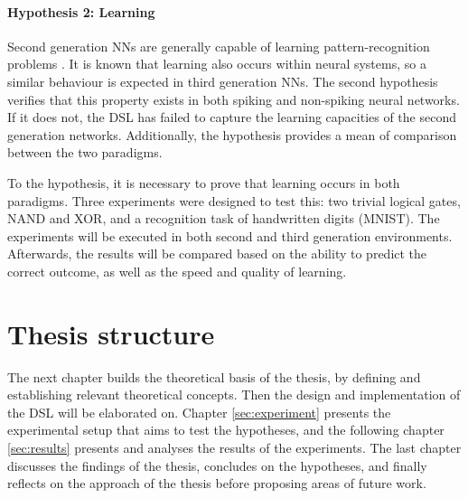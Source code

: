 \paragraph{Hypothesis 2: Learning}
Second generation \gls{NN}s are generally capable of learning pattern-recognition
problems \cite{Russel2007}.
It is known that learning also occurs within neural systems, so a
similar behaviour is expected in third generation \gls{NN}s.
The second hypothesis verifies that this property exists in both spiking and
non-spiking neural networks.
If it does not, the \gls{DSL} has failed to capture
the learning capacities of the second generation networks.
Additionally, the hypothesis provides a mean of comparison between the two paradigms.

To the hypothesis, it is necessary to prove that learning occurs
in both paradigms.
Three experiments were designed to test this: two trivial
logical gates, NAND and XOR, and a recognition task of handwritten digits
(MNIST).
The experiments will be executed in both second and third generation
environments.
Afterwards, the results will be compared based on the ability to predict the correct outcome,
as well as the speed and quality of learning.

\section{Thesis structure}
The next chapter builds the theoretical basis of the thesis, by defining and
establishing relevant theoretical concepts.
Then the design and implementation of the \gls{DSL} will be elaborated on.
Chapter \ref{sec:experiment} presents the experimental setup that aims to
test the hypotheses, and the following chapter \ref{sec:results} presents and
analyses the results of the experiments.
The last chapter discusses the findings of the thesis, concludes on the
hypotheses, and finally reflects on the approach of the thesis before proposing
areas of future work.


